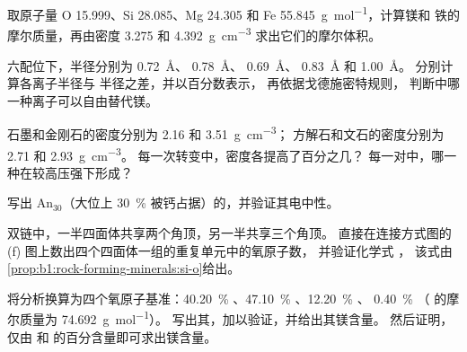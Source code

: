 \begin{exercise}[$\star$]\label{exo:b1:rock-forming-minerals:2}
取原子量 O \num{15.999}、Si \num{28.085}、Mg \num{24.305} 和
Fe \qty{55.845}{g.mol^{-1}}，计算镁和
铁的摩尔质量，再由密度 \num{3.275} 和
\qty{4.392}{g.cm^{-3}} 求出它们的摩尔体积。
\end{exercise}

\begin{exercise}[$\star$]\label{exo:b1:rock-forming-minerals:3}
六配位下，半径分别为  \qty{0.72}{\angstrom}、
 \qty{0.78}{\angstrom}、 \qty{0.69}{\angstrom}、
 \qty{0.83}{\angstrom} 和  \qty{1.00}{\angstrom}。
分别计算各离子半径与  半径之差，并以百分数表示，
再依据戈德施密特规则，
判断中哪一种离子可以自由替代镁。
\end{exercise}

\begin{exercise}[$\star$]\label{exo:b1:rock-forming-minerals:4}
石墨和金刚石的密度分别为 \num{2.16} 和 \qty{3.51}{g.cm^{-3}}；
方解石和文石的密度分别为 \num{2.71} 和 \qty{2.93}{g.cm^{-3}}。
每一次转变中，密度各提高了百分之几？
每一对中，哪一种在较高压强下形成？
\end{exercise}

\begin{exercise}[$\star\star$]\label{exo:b1:rock-forming-minerals:5}
写出 $\text{An}_{30}$（大位上 \qty{30}{\percent}
被钙占据）的，并验证其电中性。
\end{exercise}

\begin{exercise}[$\star\star$]\label{exo:b1:rock-forming-minerals:6}
双链中，一半四面体共享两个角顶，另一半共享三个角顶。
直接在连接方式图的 (f) 图上数出四个四面体一组的重复单元中的氧原子数，
并验证化学式 ，
该式由\cref{prop:b1:rock-forming-minerals:si-o}给出。
\end{exercise}

\begin{exercise}[$\star\star$]\label{exo:b1:rock-forming-minerals:7}
将分析换算为四个氧原子基准：\qty{40.20}{\percent}
、\qty{47.10}{\percent} 、\qty{12.20}{\percent} 、
\qty{0.40}{\percent} （ 的摩尔质量为
\qty{74.692}{g.mol^{-1}}）。
写出其，加以验证，并给出其镁含量。
然后证明，仅由  和
 的百分含量即可求出镁含量。
\end{exercise}

